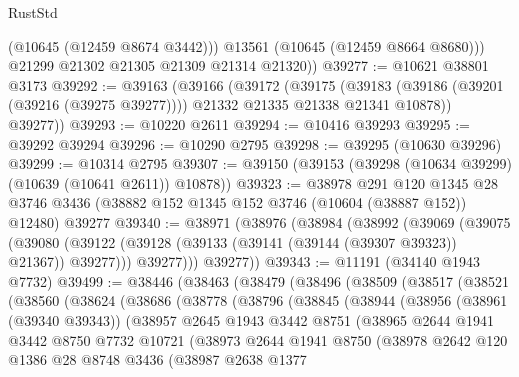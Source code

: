 \begin{lexlean}{RustStd}
\begin{coremodule}
            (@10645 (@12459 @8674 @3442)))
          @13561
          (@10645 (@12459 @8664 @8680)))
        @21299
        @21302
        @21305
        @21309
        @21314
        @21320))
@39277 := @10621 @38801 @3173
@39292 := @39163
    (@39166
      (@39172
        (@39175
          (@39183 (@39186 (@39201 (@39216 (@39275 @39277)))) @21332 @21335 @21338 @21341 @10878))
        @39277))
@39293 := @10220 @2611
@39294 := @10416 @39293
@39295 := @39292 @39294
@39296 := @10290 @2795
@39298 := @39295 (@10630 @39296)
@39299 := @10314 @2795
@39307 := @39150 (@39153 (@39298 (@10634 @39299) (@10639 (@10641 @2611)) @10878))
@39323 := @38978
    @291
    @120
    @1345
    @28
    @3746
    @3436
    (@38882 @152 @1345 @152 @3746 (@10604 (@38887 @152)) @12480)
    @39277
@39340 := @38971
    (@38976
      (@38984
        (@38992
          (@39069
            (@39075
              (@39080 (@39122 (@39128 (@39133 (@39141 (@39144 (@39307 @39323)) @21367)) @39277)))
              @39277)))
        @39277))
@39343 := @11191 (@34140 @1943 @7732)
@39499 := @38446
    (@38463
      (@38479
        (@38496
          (@38509
            (@38517
              (@38521
                (@38560
                  (@38624
                    (@38686
                      (@38778
                        (@38796
                          (@38845
                            (@38944
                              (@38956
                                (@38961 (@39340 @39343))
                                (@38957
                                  @2645
                                  @1943
                                  @3442
                                  @8751
                                  (@38965
                                    @2644
                                    @1941
                                    @3442
                                    @8750
                                    @7732
                                    @10721
                                    (@38973
                                      @2644
                                      @1941
                                      @8750
                                      (@38978
                                        @2642
                                        @120
                                        @1386
                                        @28
                                        @8748
                                        @3436
                                        (@38987
                                          @2638
                                          @1377

\end{coremodule}
\end{lexlean}
